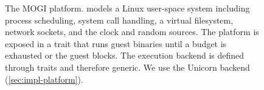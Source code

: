 \begin{figure}[htbp]
  \caption[The MOGI platform]{%
    The MOGI platform.
     models a Linux user-space system including process
    scheduling, system call handling, a virtual filesystem, network sockets, and the clock and
    random sources.
    The platform is exposed in a trait 
    that runs guest binaries until a budget is exhausted or the guest blocks.
    The execution backend is defined through traits and therefore generic.
    We use the Unicorn backend (\cref{sec:impl-platform}).
  }
  \label{fig:platform-architecture}
\end{figure}
